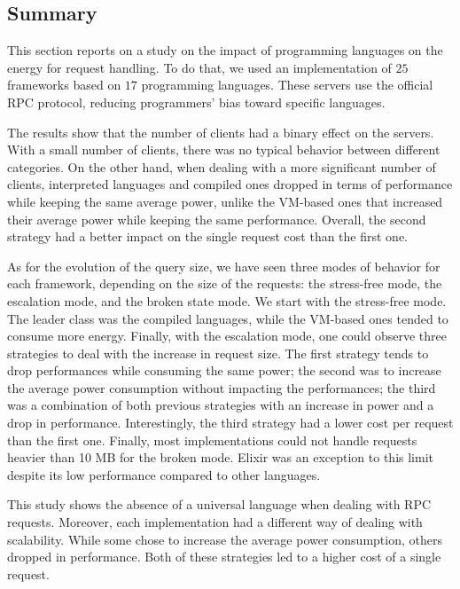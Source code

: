 
\subsection{Summary}

This section reports on a study on the impact of programming languages on the energy for request handling.
To do that, we used an implementation of $25$ frameworks based on $17$ programming languages.
These servers use the official RPC protocol, reducing programmers' bias toward specific languages.

The results show that the number of clients had a binary effect on the servers.
With a small number of clients, there was no typical behavior between different categories.
On the other hand, when dealing with a more significant number of clients, interpreted languages and compiled ones dropped in terms of performance while keeping the same average power, unlike the VM-based ones that increased their average power while keeping the same performance.
Overall, the second strategy had a better impact on the single request cost than the first one.

As for the evolution of the query size, we have seen three modes of behavior for each framework, depending on the size of the requests: the stress-free mode, the escalation mode, and the broken state mode.
We start with the stress-free mode.
The leader class was the compiled languages, while the VM-based ones tended to consume more energy.
Finally, with the escalation mode, one could observe three strategies to deal with the increase in request size.
The first strategy tends to drop performances while consuming the same power; the second was to increase the average power consumption without impacting the performances; the third was a combination of both previous strategies with an increase in power and a drop in performance.
Interestingly, the third strategy had a lower cost per request than the first one.
Finally, most implementations could not handle requests heavier than 10 MB for the broken mode.
Elixir was an exception to this limit despite its low performance compared to other languages.

This study shows the absence of a universal language when dealing with RPC requests.
Moreover, each implementation had a different way of dealing with scalability.
While some chose to increase the average power consumption, others dropped in performance.
Both of these strategies led to a higher cost of a single request.

\clearpage